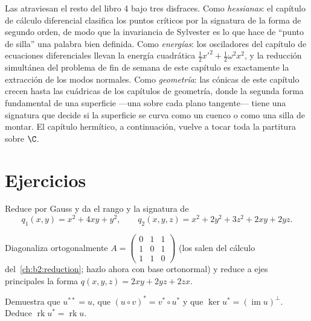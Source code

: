 \begin{remark}
Las  atraviesan el resto del libro 4 bajo tres
disfraces. Como \emph{hessianas}: el capítulo de cálculo diferencial
clasifica los puntos críticos por la signatura de la forma de
segundo orden, de modo que la invariancia de Sylvester es lo que
hace de ``punto de silla'' una palabra bien definida. Como
\emph{energías}: los osciladores del capítulo de ecuaciones
diferenciales llevan la energía cuadrática $\frac12x'^2 +
\frac12\omega^2x^2$, y la reducción simultánea del problema de fin
de semana de este capítulo es exactamente la extracción de los modos
normales. Como \emph{geometría}: las cónicas de este capítulo crecen
hasta las cuádricas de los capítulos de geometría, donde la segunda
forma fundamental de una superficie ---una  sobre
cada plano tangente--- tiene una signatura que decide si la
superficie se curva como un cuenco o como una silla de montar. El
capítulo hermítico, a continuación, vuelve a tocar toda la partitura
sobre $\C$.
\end{remark}

\section{Ejercicios}

\begin{exercise}[$\star$]\label{exo:b2:quadratic:1}
Reduce por Gauss y da el rango y la signatura de
\[
q_1(x,y) = x^2 + 4xy + y^2,
\qquad
q_2(x,y,z) = x^2 + 2y^2 + 3z^2 + 2xy + 2yz .
\]
\end{exercise}

\begin{exercise}[$\star$]\label{exo:b2:quadratic:2}
Diagonaliza ortogonalmente $A = \begin{pmatrix} 0 & 1 & 1\\ 1 & 0 &
1\\ 1 & 1 & 0\end{pmatrix}$ (los  salen del cálculo
del~\cref{ch:b2:reduction}; hazlo ahora con base ortonormal) y
reduce a ejes principales la forma $q(x,y,z) = 2xy + 2yz + 2zx$.
\end{exercise}

\begin{exercise}[$\star$]\label{exo:b2:quadratic:3}
Demuestra que $u^{**} = u$, que $(u \circ v)^* = v^* \circ u^*$ y
que $\ker u^* = (\operatorname{im} u)^{\perp}$. Deduce
$\operatorname{rk} u^* = \operatorname{rk} u$.
\end{exercise}

